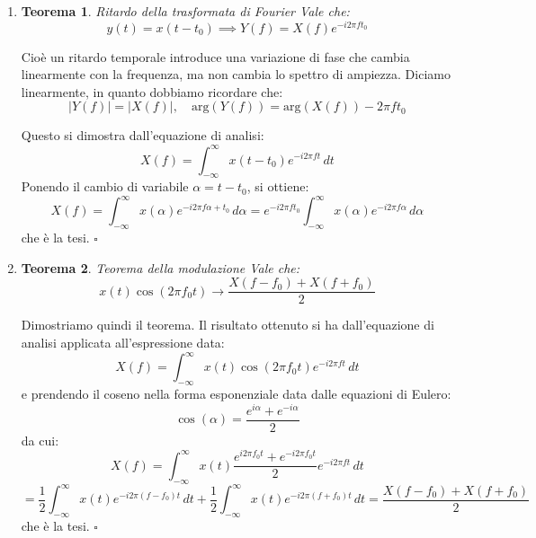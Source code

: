 \documentclass[11pt,a4paper]{article}
\newtheorem{theorem}{Teorema}[section]
\begin{document}
\begin{enumerate}
\item \begin{theorem}{Ritardo della trasformata di Fourier}
Vale che:
$$
y(t) = x(t - t_0) \implies Y(f) = X(f) e^{-i 2 \pi f t_0}
$$
\end{theorem}

Cioè un ritardo temporale introduce una variazione di fase che cambia linearmente con la frequenza, ma non cambia lo spettro di ampiezza. Diciamo linearmente, in quanto dobbiamo ricordare che:
$$
|Y(f)| = |X(f)|, \quad \mathrm{arg} \left( Y(f) \right) = \mathrm{arg} \left( X(f) \right) - 2 \pi f t_0
$$

Questo si dimostra dall'equazione di analisi:
$$
X(f) = \int_{-\infty}^{\infty} x(t - t_0) e^{-i 2 \pi f t} \, dt
$$
Ponendo il cambio di variabile $\alpha = t - t_0$, si ottiene:
$$
X(f) = \int_{-\infty}^{\infty} x(\alpha) e^{-i 2 \pi f \alpha + t_0} \, d \alpha = e^{-i 2 \pi f t_0} \int_{-\infty}^{\infty} x(\alpha) e^{-i 2 \pi f \alpha} \, d \alpha
$$
che è la tesi. \hfill $\square$

\item \begin{theorem}{Teorema della modulazione}
Vale che:
$$
x(t) \cos(2 \pi f_0 t) \rightarrow \frac{X(f - f_0) + X(f + f_0)}{2}
$$
\end{theorem}
Dimostriamo quindi il teorema. Il risultato ottenuto si ha dall'equazione di analisi applicata all'espressione data:
$$
X(f) = \int_{-\infty}^{\infty} x(t) \cos(2 \pi f_0 t) e^{-i 2 \pi f t} \, dt
$$
e prendendo il coseno nella forma esponenziale data dalle equazioni di Eulero:
$$
\cos(\alpha) = \frac{e^{i\alpha} + e ^{-i\alpha}}{2}
$$
da cui:
$$
X(f) = \int_{-\infty}^{\infty} x(t) \frac{e^{i 2\pi f_0 t} + e^{-i 2 \pi f_0 t}}{2} e^{-i 2 \pi f t} \, dt 
$$
$$
= \frac{1}{2} \int_{-\infty}^{\infty} x(t) e^{-i 2 \pi (f - f_0) t} \, dt + \frac{1}{2} \int_{-\infty}^{\infty} x(t) e^{-i 2 \pi (f + f_0) t} \, dt = \frac{X(f - f_0) + X(f + f_0)}{2}
$$
che è la tesi. \hfill $\square$

\end{enumerate}
\end{document}
